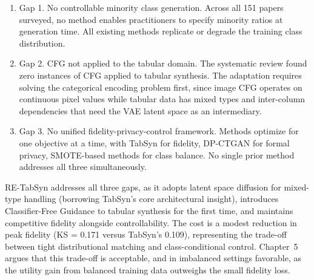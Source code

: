 \begin{enumerate}
    \item Gap 1. No controllable minority class generation. Across all 151 papers surveyed, no method enables practitioners to specify minority ratios at generation time. All existing methods replicate or degrade the training class distribution.

    \item Gap 2. CFG not applied to the tabular domain. The systematic review found zero instances of CFG applied to tabular synthesis. The adaptation requires solving the categorical encoding problem first, since image CFG operates on continuous pixel values while tabular data has mixed types and inter-column dependencies that need the VAE latent space as an intermediary.

    \item Gap 3. No unified fidelity-privacy-control framework. Methods optimize for one objective at a time, with TabSyn for fidelity, DP-CTGAN for formal privacy, SMOTE-based methods for class balance. No single prior method addresses all three simultaneously.
\end{enumerate}

RE-TabSyn addresses all three gaps, as it adopts latent space diffusion for mixed-type handling (borrowing TabSyn's core architectural insight), introduces Classifier-Free Guidance to tabular synthesis for the first time, and maintains competitive fidelity alongside controllability. The cost is a modest reduction in peak fidelity (KS = 0.171 versus TabSyn's 0.109), representing the trade-off between tight distributional matching and class-conditional control. Chapter~5 argues that this trade-off is acceptable, and in imbalanced settings favorable, as the utility gain from balanced training data outweighs the small fidelity loss.

